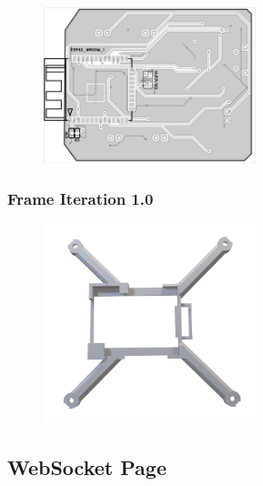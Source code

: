 \begin{figure}[H]
    \centering
    \captionsetup{justification=centering, margin=1cm}
    \includegraphics[width=0.55\textwidth]{img/PCBit2_back.png}
\end{figure}

\subsubsection{Frame Iteration 1.0}

\begin{figure}[H]
    \centering
    \captionsetup{justification=centering, margin=1cm}
    \includegraphics[width=0.55\textwidth]{img/OldFrame.png}
\end{figure}

\subsection{WebSocket Page}
\label{app:websocket}

